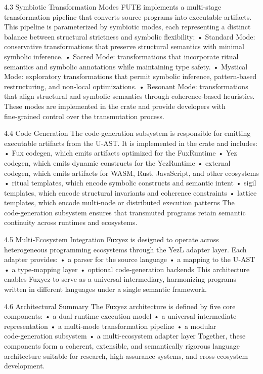 4.3 Symbiotic Transformation Modes
FUTE implements a multi‑stage transformation pipeline that converts source programs into executable artifacts. This pipeline is parameterized by symbiotic modes, each representing a distinct balance between structural strictness and symbolic flexibility:
• 	Standard Mode: conservative transformations that preserve structural semantics with minimal symbolic inference.
• 	Sacred Mode: transformations that incorporate ritual semantics and symbolic annotations while maintaining type safety.
• 	Mystical Mode: exploratory transformations that permit symbolic inference, pattern‑based restructuring, and non‑local optimizations.
• 	Resonant Mode: transformations that align structural and symbolic semantics through coherence‑based heuristics.
These modes are implemented in the  crate and provide developers with fine‑grained control over the transmutation process.

4.4 Code Generation
The code‑generation subsystem is responsible for emitting executable artifacts from the U‑AST. It is implemented in the  crate and includes:
• 	Fux codegen, which emits artifacts optimized for the FuxRuntime
• 	Yez codegen, which emits dynamic constructs for the YezRuntime
• 	external codegen, which emits artifacts for WASM, Rust, JavaScript, and other ecosystems
• 	ritual templates, which encode symbolic constructs and semantic intent
• 	sigil templates, which encode structural invariants and coherence constraints
• 	lattice templates, which encode multi‑node or distributed execution patterns
The code‑generation subsystem ensures that transmuted programs retain semantic continuity across runtimes and ecosystems.

4.5 Multi‑Ecosystem Integration
Fuxyez is designed to operate across heterogeneous programming ecosystems through the YezL adapter layer. Each adapter provides:
• 	a parser for the source language
• 	a mapping to the U‑AST
• 	a type‑mapping layer
• 	optional code‑generation backends
This architecture enables Fuxyez to serve as a universal intermediary, harmonizing programs written in different languages under a single semantic framework.

4.6 Architectural Summary
The Fuxyez architecture is defined by five core components:
• 	a dual‑runtime execution model
• 	a universal intermediate representation
• 	a multi‑mode transformation pipeline
• 	a modular code‑generation subsystem
• 	a multi‑ecosystem adapter layer
Together, these components form a coherent, extensible, and semantically rigorous language architecture suitable for research, high‑assurance systems, and cross‑ecosystem development.


